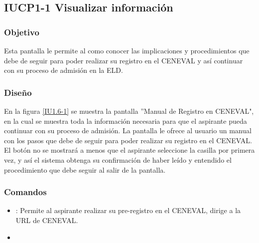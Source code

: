 \subsection{IUCP1-1 Visualizar información}

\subsubsection{Objetivo}

Esta pantalla le permite al  como conocer las implicaciones y procedimientos que debe de seguir para poder realizar su registro en el CENEVAL y así continuar con su proceso de admisión en la ELD.


\subsubsection{Diseño}
En la figura \ref{IU1.6-1} se muestra la pantalla ''Manual de Registro en CENEVAL", en la cual se muestra toda la información necesaria para que el aspirante pueda continuar con su proceso de admisión. La pantalla le ofrece al usuario un manual con los pasos que debe de seguir para poder realizar su registro en el CENEVAL.
El botón  no se mostrará a menos que el aspirante seleccione la casilla  por primera vez, y así el sistema obtenga su confirmación de haber leído y entendido el procedimiento que debe seguir al salir de la pantalla. 



\subsubsection{Comandos}
\begin{itemize}
	\item {}: Permite al aspirante realizar su pre-registro en el CENEVAL, dirige a la URL de CENEVAL.
	\item 
\end{itemize}

